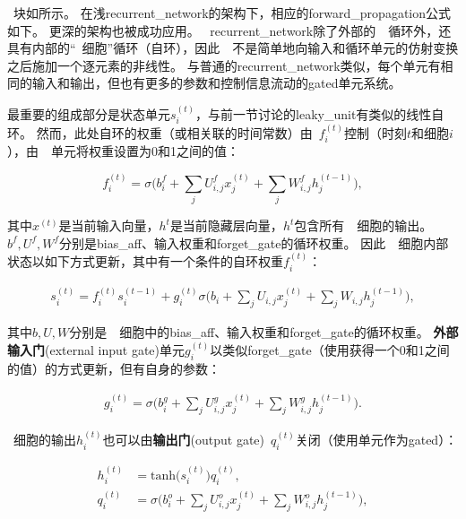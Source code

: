 ~块如所示。
在浅\gls{recurrent_network}的架构下，相应的\gls{forward_propagation}公式如下。
更深的架构也被成功应用\citep{Graves-et-al-ICASSP2013,Pascanu-et-al-ICLR2014}。
~\gls{recurrent_network}除了外部的~~循环外，还具有内部的``~细胞''循环（自环），因此~~不是简单地向输入和循环单元的仿射变换之后施加一个逐元素的非线性。
与普通的\gls{recurrent_network}类似，每个单元有相同的输入和输出，但也有更多的参数和控制信息流动的\gls{gated}单元系统。

最重要的组成部分是状态单元$s_i^{(t)}$，与前一节讨论的\gls{leaky_unit}有类似的线性自环。
然而，此处自环的权重（或相关联的时间常数）由~$f_i^{(t)}$控制（时刻$t$和细胞$i$），由~~单元将权重设置为0和1之间的值：

\begin{equation}
f_i^{(t)} = \sigma \Big( b_i^f + \sum_j U_{i,j}^f x_j^{(t)} + \sum_j W_{i,j}^f h_j^{(t-1)} \Big),
\end{equation}

其中$x^{(t)}$是当前输入向量，$h^{t}$是当前隐藏层向量，$h^{t}$包含所有~~细胞的输出。 
$b^f, U^f, W^f$分别是\gls{bias_aff}、输入权重和\gls{forget_gate}的循环权重。
因此~~细胞内部状态以如下方式更新，其中有一个条件的自环权重$f_i^{(t)}$：

\begin{align}
s_i^{(t)} = f_i^{(t)}  s_i^{(t-1)} +  g_i^{(t)}
\sigma \Big( b_i + \sum_j U_{i,j} x_j^{(t)} + \sum_j W_{i,j} h_j^{(t-1)} \Big),
\end{align}

其中$b, U, W$分别是~~细胞中的\gls{bias_aff}、输入权重和\gls{forget_gate}的循环权重。
\textbf{外部输入门}(external input gate)单元$g_i^{(t)}$以类似\gls{forget_gate}（使用获得一个0和1之间的值）的方式更新，但有自身的参数：

\begin{align}
g_i^{(t)} = \sigma \Big( b_i^g + \sum_j U_{i,j}^g x_j^{(t)} + \sum_j W_{i,j}^g h_j^{(t-1)} \Big).
\end{align}

~细胞的输出$h_i^{(t)}$也可以由\textbf{输出门}(output gate)~$q_i^{(t)}$关闭（使用单元作为\gls{gated}）：

\begin{align}
h_i^{(t)} &= \text{tanh}\big( s_i^{(t)} \big) q_i^{(t)}, \\
q_i^{(t)} &= \sigma \Big( b_i^o + \sum_j U_{i,j}^o x_j^{(t)} + \sum_j W_{i,j}^o h_j^{(t-1)} \Big),
\end{align}

